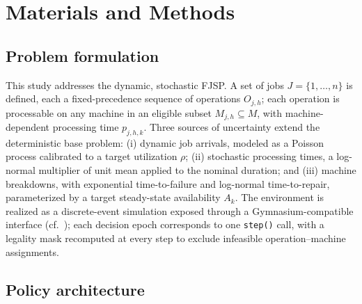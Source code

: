 \documentclass[11pt]{article}
\begin{document}
\section{Materials and Methods}
\label{sec:methods}

\subsection{Problem formulation}

This study addresses the dynamic, stochastic FJSP. A set of jobs $J=\{1,\dots,n\}$ is defined, each a fixed-precedence sequence of operations $O_{j,h}$; each operation is processable on any machine in an eligible subset $M_{j,h}\subseteq M$, with machine-dependent processing time $p_{j,h,k}$. Three sources of uncertainty extend the deterministic base problem: (i) dynamic job arrivals, modeled as a Poisson process calibrated to a target utilization $\rho$; (ii) stochastic processing times, a log-normal multiplier of unit mean applied to the nominal duration; and (iii) machine breakdowns, with exponential time-to-failure and log-normal time-to-repair, parameterized by a target steady-state availability $A_k$. The environment is realized as a discrete-event simulation exposed through a Gymnasium-compatible interface (cf.\ \citealp{tassel2021}); each decision epoch corresponds to one \texttt{step()} call, with a legality mask recomputed at every step to exclude infeasible operation--machine assignments.

\subsection{Policy architecture}
\label{sec:architecture}
\end{document}

